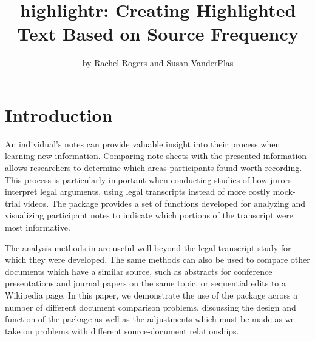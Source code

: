 \title{highlightr: Creating Highlighted Text Based on Source Frequency}


\author{by Rachel Rogers and Susan VanderPlas}

\maketitle


\section{Introduction}\label{introduction}

An individual's notes can provide valuable insight into their process when learning new information.
Comparing note sheets with the presented information allows researchers to determine which areas participants found worth recording.
This process is particularly important when conducting studies of how jurors interpret legal arguments, using legal transcripts instead of more costly mock-trial videos.
The  package \citep{highlightr} provides a set of functions developed for analyzing and visualizing participant notes to indicate which portions of the transcript were most informative.

The analysis methods in  are useful well beyond the legal transcript study for which they were developed.
The same methods can also be used to compare other documents which have a similar source, such as abstracts for conference presentations and journal papers on the same topic, or sequential edits to a Wikipedia page.
In this paper, we demonstrate the use of the  package across a number of different document comparison problems, discussing the design and function of the package as well as the adjustments which must be made as we take on problems with different source-document relationships.

